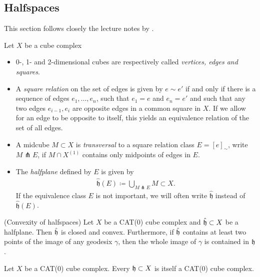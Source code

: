 \subsection{Halfspaces}
\label{sec:halfspaces}

This section follows closely the lecture notes by \textcite{Rolli2012}.

\begin{defin}
  Let \(X\) be a cube complex
  \begin{itemize}
  \item 0-, 1- and 2-dimensional cubes are respectively called \emph{vertices, edges and squares}.
  \item A \emph{square relation} on the set of edges is given by \(e \sim e'\) if and only if there is a sequence of edges \(e_1, \dots, e_n\), such that \(e_1 = e\) and \(e_n = e'\) and such that any two edges \(e_{i-1}, e_i\) are opposite edges in a common square in \(X\). If we allow for an edge to be opposite to itself, this yields an equivalence relation of the set of all edges.
  \item A midcube \(M \subset X\) is \emph{transversal} to a square relation class \(E = [e]_\sim\), write \(M \pitchfork E\), if \(M \cap X^{(1)}\) contains only midpoints of edges in \(E\).
  \item The \emph{halfplane} defined by \(E\) is given by
    \begin{align*}
      \mathfrak{\hat h}(E) \coloneqq \bigcup_{M \pitchfork E} M \subset X.
    \end{align*}
    If the equivalence class \(E\) is not important, we will often write \(\mathfrak{\hat h}\) instead of \(\mathfrak{\hat h}(E)\).
  \end{itemize}
\end{defin}

\begin{prop}(Convexity of halfspaces)
  Let \(X\) be a CAT(0) cube complex and \(\mathfrak{\hat h} \subset X\) be a halfplane. Then \(\mathfrak{\hat h}\) is closed and convex. Furthermore, if \(\mathfrak{\hat h}\) contains at least two points of the image of any geodesix \(\gamma\), then the whole image of \(\gamma\) is contained in \(\mathfrak{h}\).
\end{prop}

\begin{cor}
  Let \(X\) be a CAT(0) cube complex. Every \(\mathfrak{h} \subset X\) is itself a CAT(0) cube complex.
\end{cor}

